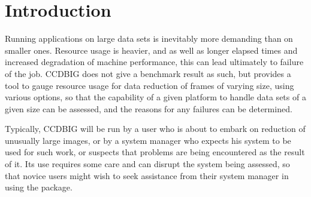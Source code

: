 \stardocabstract
 \begin{latexonly}
   \setlength{\parskip}{0mm}
   \latexonlytoc
   \setlength{\parskip}{\medskipamount}
   \markright{\stardocname}
 \end{latexonly}
\newpage
\renewcommand{\thepage}{\arabic{page}}
\setcounter{page}{1}




\newcommand{\KAPPAref}{\xref{KAPPA}{sun95}{}}
\newcommand{\CCDPref}{\xref{CCDPACK}{sun139}{}}
\newcommand{\GWMref}{\xref{GWM}{sun130}{}}
\newcommand{\KAPPAcmd}[1]{\xref{#1}{sun95}{#1}}
\newcommand{\CCDPcmd}[1]{\xref{#1}{sun139}{#1}}

\newcommand{\atimesb}[2]{\mbox{$#1 \times #2$}}
\begin{htmlonly}
  \renewcommand{\atimesb}[2]{\mbox{$#1$ x $#2$}}
\end{htmlonly}



\section{Introduction}

Running applications on large data sets 
is inevitably more demanding than on smaller ones.
Resource usage is heavier, and as well as longer 
elapsed times and increased degradation of machine performance, 
this can lead ultimately to failure of the job. 
CCDBIG does not give a benchmark result as such,
but provides a tool to gauge resource usage 
for data reduction of frames of varying size,
using various options,
so that the capability of a given platform to handle data sets
of a given size can be assessed, 
and the reasons for any failures can be determined.

Typically, CCDBIG will be run by a user who is about to
embark on reduction of unusually large images, or by a 
system manager who expects his system to be used for such work, 
or suspects that problems are being encountered as the result of it.
Its use requires some care and can disrupt the system being 
assessed, so that novice users might wish to seek assistance
from their system manager in using the package.


